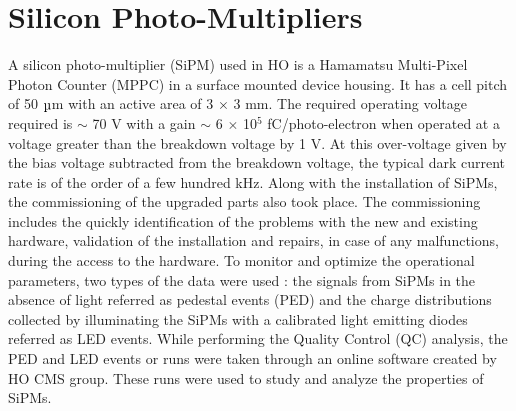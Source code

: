 \section{Silicon Photo-Multipliers}
A silicon photo-multiplier (SiPM) used in HO is a Hamamatsu Multi-Pixel Photon Counter (MPPC) in a surface mounted device housing. It has a cell pitch of 50 $\micro$m with an active area of 3 $\times$ 3 mm. The required operating voltage required is $\sim$ 70 V with a gain $\sim$ 6 $\times$ 10$^5$ fC/photo-electron when operated at a voltage greater than the breakdown voltage by 1 V. At this over-voltage given by the bias voltage subtracted from the breakdown voltage, the typical dark current rate is of the order of a few hundred kHz. Along with the installation of SiPMs, the commissioning of the upgraded parts also took place. The commissioning includes the quickly identification of the problems with the new and existing hardware, validation of the installation and repairs, in case of any malfunctions, during the access to the hardware. To monitor and optimize the operational parameters, two types of the data were used : the signals from SiPMs in the absence of light referred as pedestal events (PED) and the charge distributions collected by illuminating the SiPMs with a calibrated light emitting diodes referred as LED events. While performing the Quality Control (QC) analysis, the PED and LED events or runs were taken through an online software created by HO CMS group. These runs were used to study and analyze the properties of SiPMs. 

